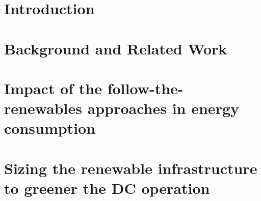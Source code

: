 
\chapter{Introduction} 
\label{chap:intro}





\chapter{Background and Related Work}
\label{chap:background}





\chapter[Impact of the follow-the-renewables approaches in energy consumption]{Impact of the follow-the-renewables approaches in energy consumption\footnotemark}
\label{chap:smartgreens}







\chapter[Sizing the renewable infrastructure to greener the DC operation]{Sizing the renewable infrastructure to greener the DC operation\footnotemark}
\label{chap:ccgrid}








